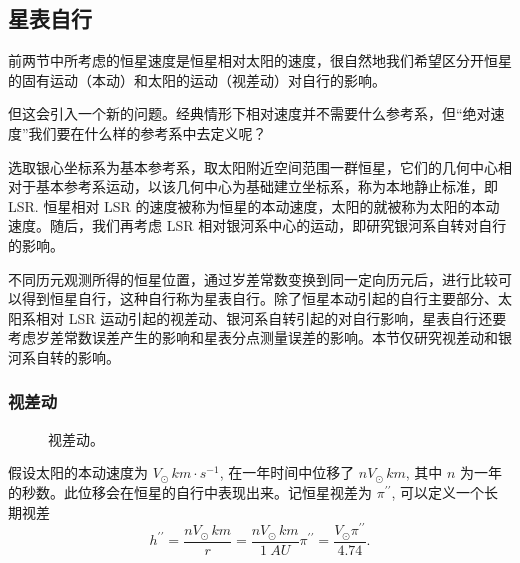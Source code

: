 \documentclass[UTF8, 12pt, a4paper, oneside, onecolumn, fontset=none]{ctexart}
\begin{document}
\subsection{星表自行}
前两节中所考虑的恒星速度是恒星相对太阳的速度，很自然地我们希望区分开恒星的固有运动（本动）和太阳的运动（视差动）对自行的影响。

但这会引入一个新的问题。经典情形下相对速度并不需要什么参考系，但“绝对速度”我们要在什么样的参考系中去定义呢？

选取银心坐标系为基本参考系，取太阳附近空间范围一群恒星，它们的几何中心相对于基本参考系运动，以该几何中心为基础建立坐标系，称为本地静止标准，即 LSR. 恒星相对 LSR 的速度被称为恒星的本动速度，太阳的就被称为太阳的本动速度。随后，我们再考虑 LSR 相对银河系中心的运动，即研究银河系自转对自行的影响。

不同历元观测所得的恒星位置，通过岁差常数变换到同一定向历元后，进行比较可以得到恒星自行，这种自行称为星表自行。除了恒星本动引起的自行主要部分、太阳系相对 LSR 运动引起的视差动、银河系自转引起的对自行影响，星表自行还要考虑岁差常数误差产生的影响和星表分点测量误差的影响。本节仅研究视差动和银河系自转的影响。

\subsubsection{视差动}
\begin{figure}[!htp]
\centering
{}
\captionsetup{justification=raggedright, singlelinecheck=false}
\caption{视差动。}
\label{视差动。}
\end{figure}

假设太阳的本动速度为 $V_{\odot}\,\unit{km\cdot{}s^{-1}}$, 在一年时间中位移了 $nV_{\odot}\,\unit{km}$, 其中 $n$ 为一年的秒数。此位移会在恒星的自行中表现出来。记恒星视差为 $\pi^{\prime\prime}$, 可以定义一个长期视差
\begin{equation}
h^{\prime\prime}=\frac{nV_{\odot}\,\unit{km}}{r}=\frac{nV_{\odot}\,\unit{km}}{\qty{1}{AU}}\pi^{\prime\prime}=\frac{V_{\odot}\pi^{\prime\prime}}{4.74}.
\end{equation}
\end{document}
